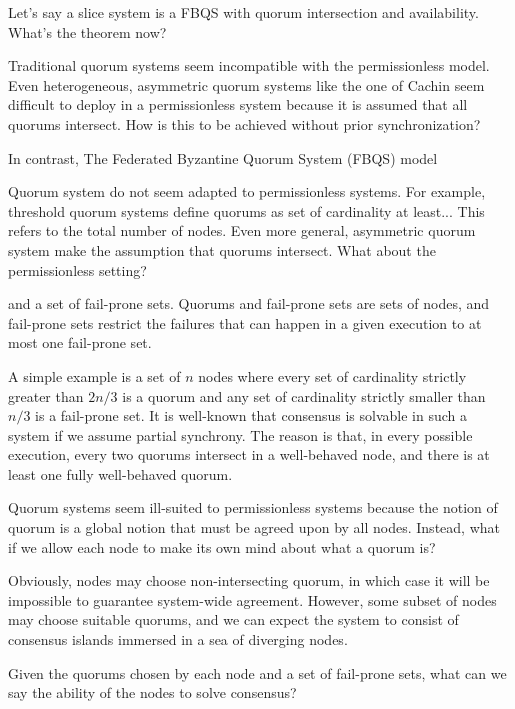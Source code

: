 \documentclass[11pt]{article}
\begin{document}
Let's say a slice system is a FBQS with quorum intersection and availability.
What's the theorem now?

Traditional quorum systems seem incompatible with the permissionless model. Even
heterogeneous, asymmetric quorum systems like the one of Cachin seem difficult
to deploy in a permissionless system because it is assumed that all quorums
intersect. How is this to be achieved without prior synchronization?

In contrast, The Federated Byzantine Quorum System (FBQS) model

Quorum system do not seem adapted to permissionless systems. For example,
threshold quorum systems define quorums as set of cardinality at least... This
refers to the total number of nodes. Even more general, asymmetric quorum
system make the assumption that quorums intersect.
What about the permissionless setting?

and a set of fail-prone sets.
Quorums and fail-prone sets are sets of nodes, and fail-prone sets restrict the
failures that can happen in a given execution to at most one fail-prone set.

A simple example is a set of $n$ nodes where every set of cardinality strictly
greater than $2n/3$ is a quorum and any set of cardinality strictly smaller
than $n/3$ is a fail-prone set. It is well-known that consensus is solvable in
such a system if we assume partial synchrony. The reason is that, in every
possible execution, every two quorums intersect in a well-behaved node, and
there is at least one fully well-behaved quorum.

Quorum systems seem ill-suited to permissionless systems because the notion of
quorum is a global notion that must be agreed upon by all nodes. Instead, what
if we allow each node to make its own mind about what a quorum is?


Obviously, nodes may choose non-intersecting quorum, in which case it will be
impossible to guarantee system-wide agreement. However, some subset of nodes
may choose suitable quorums, and we can expect the system to consist of
consensus islands immersed in a sea of diverging nodes.

Given the quorums chosen by each node and a set of fail-prone sets, what can we
say the ability of the nodes to solve consensus?

\end{document}
